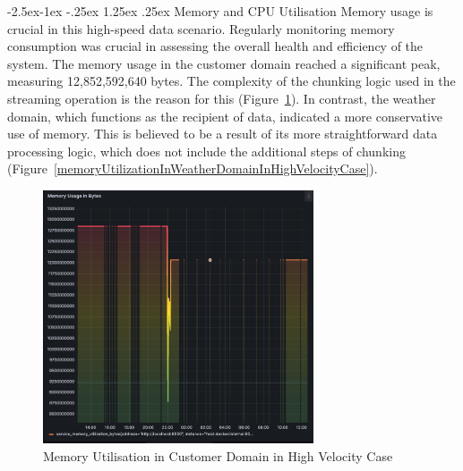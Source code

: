 \documentclass[review]{elsarticle}
\makeatletter
\renewcommand\paragraph{\@startsection{paragraph}{4}{\z@}%
            {-2.5ex\@plus -1ex \@minus -.25ex}%
            {1.25ex \@plus .25ex}%
            {\normalfont\normalsize\itshape}}
\makeatother
\begin{document}
\paragraph{Memory and CPU Utilisation} Memory usage is crucial in this high-speed data scenario. Regularly monitoring memory consumption was crucial in assessing the overall health and efficiency of the system. The memory usage in the customer domain reached a significant peak, measuring 12,852,592,640 bytes. The complexity of the chunking logic used in the streaming operation is the reason for this (Figure~\ref{memoryUtilizationInCustomerDomainInHighVelocityCase}). In contrast, the weather domain, which functions as the recipient of data, indicated a more conservative use of memory. This is believed to be a result of its more straightforward data processing logic, which does not include the additional steps of chunking (Figure~\ref{memoryUtilizationInWeatherDomainInHighVelocityCase}).

\begin{figure}[ht]

  \centering

  \includegraphics[width=8cm]{images/memory-utilization-in-customer-domain-in-streaming-case.png}

  \caption{Memory Utilisation in Customer Domain in High Velocity Case}

  \label{memoryUtilizationInCustomerDomainInHighVelocityCase}

\end{figure}
\end{document}
